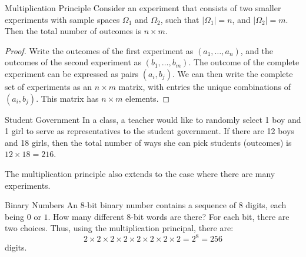 \begin{frame}[allowframebreaks]{Multiplication Principle}
  Consider an experiment that consists of two smaller experiments with sample spaces $\Omega_1$ and $\Omega_2$, such that $|\Omega_1| = n$, and $|\Omega_2| = m$. Then the total number of outcomes is $n \times m$. 
  
  \begin{proof}
    Write the outcomes of the first experiment as $(a_1, \ldots, a_n)$, and the outcomes of the second experiment as $(b_1, \ldots, b_m)$. The outcome of the complete experiment can be expressed as pairs $(a_i, b_j)$. We can then write the complete set of experiments as an $n \times m$ matrix, with entries the unique combinations of $(a_i, b_j)$. This matrix has $n \times m$ elements.
  \end{proof}
  
  \begin{exampleblock}{Student Government}
    In a class, a teacher would like to randomly select 1 boy and 1 girl to serve as representatives to the student government. If there are 12 boys and 18 girls, then the total number of ways she can pick students (outcomes) is $12 \times 18 = 216$.
  \end{exampleblock}
  
  The multiplication principle also extends to the case where there are many experiments.
  
  \begin{exampleblock}{Binary Numbers}
    An 8-bit binary number contains a sequence of 8 digits, each being $0$ or $1$. How many different $8$-bit words are there? For each bit, there are two choices. Thus, using the multiplication principal, there are:
    $$
    2 \times 2 \times 2 \times 2 \times 2 \times 2 \times 2 \times 2 = 2^8 = 256
    $$
    digits.
  \end{exampleblock}
\end{frame}

